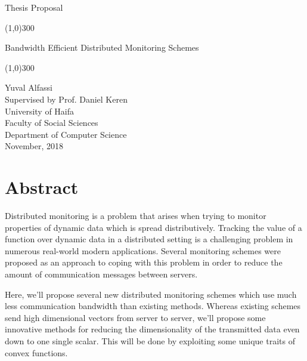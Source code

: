 \documentclass[11pt, conference]{article}
\begin{document}
	\begin{titlepage}
		\begin{center}
			\vspace*{1cm}
			\begin{Huge}
				Thesis Proposal \\
			\end{Huge}
			\vspace{1cm}
			\line(1,0){300} \\
			\vspace{0.2cm}
			\begin{Huge}
				Bandwidth Efficient Distributed Monitoring Schemes \\
			\end{Huge}
			\line(1,0){300} \\
			\vspace{1.5cm}
			\begin{Large}
				Yuval Alfassi \\
			\vspace{1cm}
				Supervised by Prof. Daniel Keren \\
			\vspace{2.5cm}
				University of Haifa \\
				Faculty of Social Sciences \\
				Department of Computer Science \\
			\vspace{1.5cm}
				November, 2018 \\
			\end{Large}
		\end{center}
	\end{titlepage}


\section*{Abstract}

Distributed monitoring is a problem that arises when trying to monitor properties of dynamic data which is spread distributively. Tracking the value of a function over dynamic data in a distributed setting is a challenging problem in numerous real-world modern applications. Several monitoring schemes were proposed as an approach to coping with this problem in order to reduce the amount of communication messages between servers.

Here, we'll propose several new distributed monitoring schemes which use much less communication bandwidth than existing methods. Whereas existing schemes send high dimensional vectors from server to server, we'll propose some innovative methods for reducing the dimensionality of the transmitted data even down to one single scalar. This will be done by exploiting some unique traits of convex functions.
\end{document}

